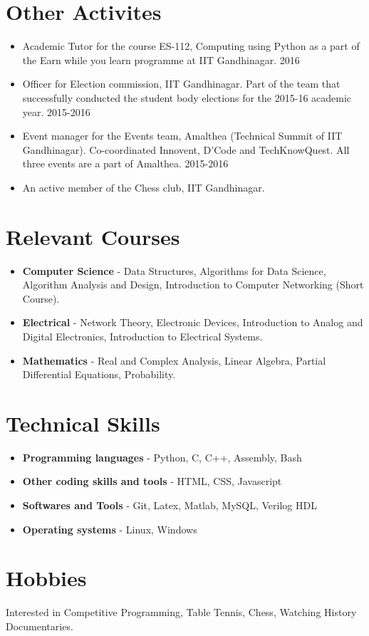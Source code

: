 \documentclass[margin, centered]{res}
\begin{document}
\begin{resume}
\section{Other Activites}
\begin{itemize}[leftmargin=*]
\item Academic Tutor for the course ES-112, Computing using Python as a part of the Earn while you learn programme at IIT Gandhinagar.
\hfill {2016}
\item Officer for Election commission, IIT Gandhinagar. Part of the team that successfully conducted the student body elections for the 2015-16 academic year.
\hfill{2015-2016}
\item Event manager for the Events team, Amalthea (Technical Summit of IIT Gandhinagar). Co-coordinated Innovent, D’Code and TechKnowQuest. All three events are a part of Amalthea.
\hfill{2015-2016}
\item An active member of the Chess club, IIT Gandhinagar.
\end{itemize}
\section{Relevant Courses}
\begin{itemize}[leftmargin=*]
\item {\bf Computer Science} - Data Structures, Algorithms for Data Science, Algorithm Analysis and Design, Introduction to Computer Networking (Short Course).
\item {\bf Electrical} - Network Theory, Electronic Devices, Introduction to Analog and Digital Electronics, Introduction to Electrical Systems.
\item {\bf Mathematics} - Real and Complex Analysis, Linear Algebra, Partial Differential Equations, Probability.

\end{itemize}

\section{Technical Skills}
\begin{itemize}[leftmargin=*]
\item {\bf Programming languages} - Python, C, C++, Assembly, Bash
\item {\bf Other coding skills and tools} - HTML, CSS, Javascript
\item {\bf Softwares and Tools} - Git, Latex, Matlab, MySQL, Verilog HDL
\item {\bf Operating systems} - Linux, Windows
\end{itemize}



\section{Hobbies}Interested in Competitive Programming, Table Tennis, Chess, Watching History Documentaries.

\end{resume}
\end{document}
